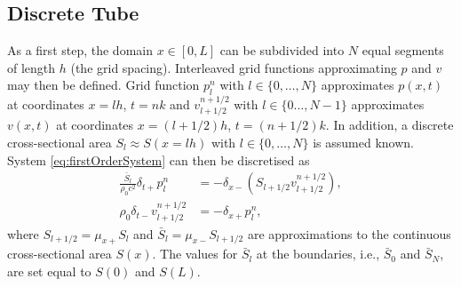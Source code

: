 \subsection{Discrete Tube}\label{sec:discSyst}
As a first step, the domain $x\in [0, L]$ can be subdivided into $N$ equal segments of length $h$ (the grid spacing). %
Interleaved grid functions approximating $p$ and $v$ may then be defined. Grid function $p_l^n$ with $l\in\{0,\hdots,N\}$
approximates $p(x,t)$ at coordinates $x=lh$, $t=nk$ and $v_{l+1/2}^{n+1/2}$ with $l\in\{0\hdots,N-1\}$ approximates $v(x,t)$ at coordinates $x=(l+1/2)h$, $t=(n+1/2)k$. In addition, a discrete cross-sectional area $S_l\approx S(x=lh)$ with $l\in \{0,\hdots,N\}$ is assumed known.
%
System \eqref{eq:firstOrderSystem} can then be discretised as
\begin{subequations}\label{eq:FDS}
    \begin{align}
        \frac{\bar S_l}{\rho_0 c^2}\delta_{t+}p_l^n &= -\delta_{x-}(S_{l+1/2}v_{l+1/2}^{n+1/2}),\label{eq:discPressure}\\
        \rho_0 \delta_{t-}v_{l+1/2}^{n+1/2}&=-\delta_{x+}p_l^n,\label{eq:discVelocity}
    \end{align}
\end{subequations}
where $S_{l+1/2} = \mu_{x+}S_l$ and $\bar S_l = \mu_{x-}S_{l+1/2}$ are approximations to the continuous cross-sectional area $S(x)$. The values for $\bar S_l$ at the boundaries, i.e., $\bar S_0$ and $\bar S_N$, are set equal to $S(0)$ and $S(L)$.

